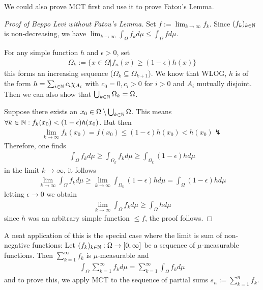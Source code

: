 \begin{rem}[]
  We could also prove MCT first and use it to prove Fatou's Lemma.
\end{rem}
\begin{proof}[Proof of Beppo Levi without Fatou's Lemma]

  Set $f := \lim_{k \to \infty} f_k$.
  Since $(f_k)_{k \in \mathbb{N}}$ is non-decreasing, we have $\lim_{k \to \infty} \int_{\Omega} f_k d \mu \leq \int_{\Omega} f d \mu$.

  For any simple function $h$ and $\epsilon > 0$, set
  \begin{align*}
    \Omega_k := \{x \in \Omega \big\vert f_n(x) \geq (1-\epsilon) h(x)\}
  \end{align*}
  this forms an increasing sequence ($\Omega_k \subseteq \Omega_{k+1}$).
  We know that WLOG, $h$ is of the form $h = \sum_{i \in \mathbb{N}}c_i \chi_{A_i}$ with $c_0 = 0, c_i > 0$ for $i > 0$ and $A_i$ mutually disjoint.
  Then we can also show that $\bigcup_{k\in \mathbb{N}} \Omega_k = \Omega$.

  Suppose there exists an $x_0 \in \Omega \setminus \bigcup_{k \in \mathbb{N}}\Omega$.
  This means $\forall k \in \N: f_k(x_0) < (1- \epsilon) h(x_0)$.
  But then
  \begin{align*}
    \lim_{k \to \infty}f_k(x_0) = f(x_0) \leq (1 - \epsilon) h(x_0) < h(x_0) \lightning
  \end{align*}
  Therefore, one finds
  \begin{align*}
    \int_{\Omega} f_k d \mu \geq \int_{\Omega_k} f_k d \mu \geq \int_{\Omega_k} (1-\epsilon)h d \mu
  \end{align*}
  in the limit $k \to  \infty$, it follows
  \begin{align*}
    \lim_{k \to \infty} \int_{\Omega} f_k d \mu \geq \lim_{k \to \infty} \int_{\Omega_k} (1- \epsilon)h d \mu = \int_{\Omega} (1-\epsilon)h d \mu
  \end{align*}
  letting $\epsilon \to 0$ we obtain
  \begin{align*}
    \lim_{k \to \infty} \int_{\Omega} f_k d \mu
    \geq \int_{\Omega} h d \mu
  \end{align*}
  since $h$ was an arbitrary simple function $\leq f$, the proof follows.


\end{proof}

\begin{ex}[]
  A neat application of this is the special case where the limit is sum of non-negative functions:
  Let $(f_k)_{k \in \mathbb{N}}: \Omega \to [0,\infty]$ be a sequence of $\mu$-measurable functions.
  Then $\sum_{k=1}^{\infty}f_k$ is $\mu$-measurable and
  \begin{align*}
    \int_{\Omega} \sum_{k=1}^{\infty}f_k d \mu = \sum_{k=1}^{\infty} \int_{\Omega} f_k d \mu
  \end{align*}
  and to prove this, we apply MCT to the sequence of partial sums $s_n := \sum_{k=1}^{n}f_k$.
\end{ex}




